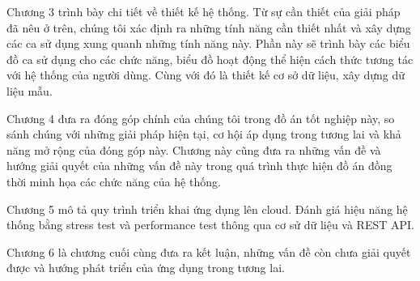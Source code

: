 Chương 3 trình bày chi tiết về thiết kế hệ thống. Từ sự cần thiết
của giải pháp đã nêu ở trên, chúng tôi xác định ra những tính năng cần thiết
nhất và xây dựng các ca sử dụng xung quanh những tính năng này.
Phần này sẽ trình bày các biểu đồ ca sử dụng cho các chức năng,
biểu đồ hoạt động thể hiện cách thức tương tác với hệ thống của
người dùng. Cùng với đó là thiết kế cơ sở dữ liệu, xây dựng dữ liệu mẫu.

Chương 4 đưa ra đóng góp chính của chúng tôi trong đồ án tốt nghiệp này,
so sánh chúng với những giải pháp hiện tại, cơ hội áp dụng trong
tương lai và khả năng mở rộng của đóng góp này. Chương này cũng
đưa ra những vấn đề và hướng giải quyết của những vấn đề này
trong quá trình thực hiện đồ án đồng thời 
minh họa các chức năng của hệ thống.

Chương 5 mô tả quy trình triển khai ứng dụng lên cloud.
Đánh giá hiệu năng hệ thống bằng stress test và performance test
thông qua cơ sử dữ liệu và REST API. 

Chương 6 là chương cuối cùng đưa ra kết luận, những vấn đề còn
chưa giải quyết được và hướng phát triển của ứng dụng trong tương lai.
